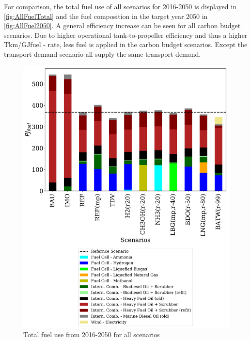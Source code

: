 \documentclass[article]{elsarticle}
\begin{document}
For comparison, the total fuel use of all scenarios for 2016-2050 is displayed in \autoref{fig:AllFuelTotal} and the fuel composition in the target year 2050 in \autoref{fig:AllFuel2050}. A general efficiency increase can be seen for all carbon budget scenarios. Due to higher operational tank-to-propeller efficiency and thus a higher Tkm/GJfuel - rate, less fuel is applied in the carbon budget scenarios. Except the transport demand scenario all supply the same transport demand.

\begin{figure}[htb]
    \centering
    \includegraphics[width=\textwidth]{figures/AllFuelTotal.pdf}
    \caption{Total fuel use from 2016-2050 for all scenarios}
    \label{fig:AllFuelTotal}
\end{figure}
\end{document}
